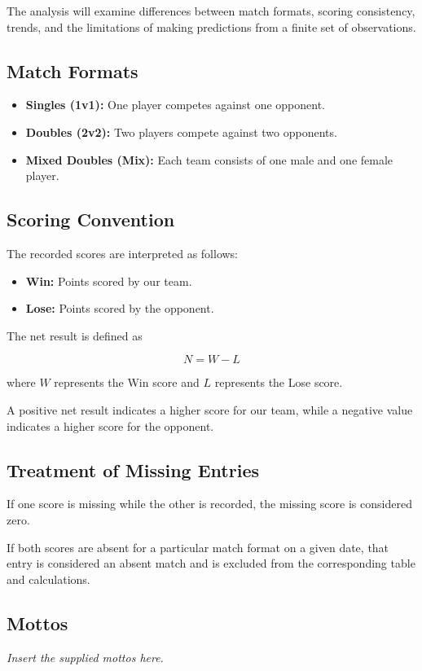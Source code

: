 The analysis will examine differences between match
formats, scoring consistency, trends, and the limitations
of making predictions from a finite set of observations.

\subsection{Match Formats}

\begin{itemize}[leftmargin=*]

    \item \textbf{Singles (1v1):}
    One player competes against one opponent.

    \item \textbf{Doubles (2v2):}
    Two players compete against two opponents.

    \item \textbf{Mixed Doubles (Mix):}
    Each team consists of one male and one female player.

\end{itemize}

\subsection{Scoring Convention}

The recorded scores are interpreted as follows:

\begin{itemize}[leftmargin=*]

    \item \textbf{Win:} Points scored by our team.
    \item \textbf{Lose:} Points scored by the opponent.

\end{itemize}

The net result is defined as

\[
N = W-L
\]

where \(W\) represents the Win score and \(L\)
represents the Lose score.

A positive net result indicates a higher score
for our team, while a negative value indicates
a higher score for the opponent.

\subsection{Treatment of Missing Entries}

If one score is missing while the other is recorded,
the missing score is considered zero.

If both scores are absent for a particular match
format on a given date, that entry is considered
an absent match and is excluded from the corresponding
table and calculations.

\subsection{Mottos}

\begin{center}
    \textit{Insert the supplied mottos here.}
\end{center}

